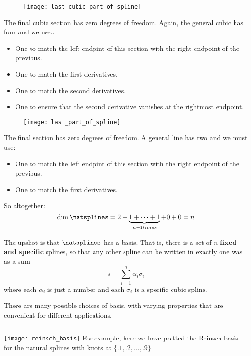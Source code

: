 \begin{frame}
	\begin{figure}
    \texttt{[image: last\_cubic\_part\_of\_spline]}
	\end{figure}
  The final cubic section has zero degrees of freedom.  Again, the general cubic has four and we use::
  \begin{itemize}
    \item One to match the left endpint of this section with the right endpoint of the previous.
    \item One to match the first derivatives.
    \item One to match the second derivatives.
    \item One to ensure that the second derivative vanishes at the rightmost endpoint.
  \end{itemize}
\end{frame}
%
%
\begin{frame}
	\begin{figure}
    \texttt{[image: last\_part\_of\_spline]}
	\end{figure}
  The final section has zero degrees of freedom.  A general line has two and we must use:
  \begin{itemize}
    \item One to match the left endpint of this section with the right endpoint of the previous.
    \item One to match the first derivatives.
  \end{itemize}
\end{frame}
%
%
\begin{frame}
  So altogether:
  $$ \dim \natsplines = 2 + \underbrace{1 + \cdots + 1}_{n-2 times} + 0 + 0 = n $$
\end{frame}
%
%
\begin{frame}
  The upshot is that $\natsplines$ has a basis.  That is, there is a set of $n$ \textbf{fixed and specific} splines, so that any other spline can be written in exactly one was as a sum:
  $$ s = \sum_{i=1}^n \alpha_i \sigma_i $$
where each $\alpha_i$ is just a number and each $\sigma_i$ is a specific cubic spline.
\end{frame}
%
%
\begin{frame}
  There are many possible choices of basis, with varying properties that are convenient for different applications. 
\end{frame}
%
%
\begin{frame}
  \begin{columns}
      \texttt{[image: reinsch\_basis]}
      For example, here we have poltted the Reinsch basis for the natural splines with knots at $\{ .1, .2, \ldots, .9\}$
  \end{columns}
\end{frame}
